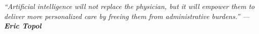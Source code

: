 \chapter*{}
\vspace*{\fill}

\begin{center}
\begin{minipage}{0.65\textwidth}
    \centering
    \itshape
    “Artificial intelligence will not replace the physician, but it will empower them to deliver more personalized care by freeing them from administrative burdens.”
    \vspace{1em}
    --- \textbf{Eric Topol}
\end{minipage}
\end{center}

\vspace*{\fill}
\newpage